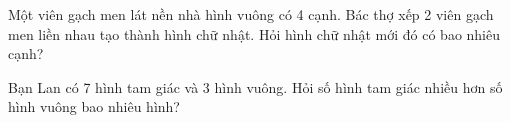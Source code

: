 \begin{ex}
Một viên gạch men lát nền nhà hình vuông có 4 cạnh. Bác thợ xếp 2 viên gạch men liền nhau tạo thành hình chữ nhật. Hỏi hình chữ nhật mới đó có bao nhiêu cạnh?
\end{ex}

\begin{ex}
Bạn Lan có 7 hình tam giác và 3 hình vuông. Hỏi số hình tam giác nhiều hơn số hình vuông bao nhiêu hình?
\end{ex}
